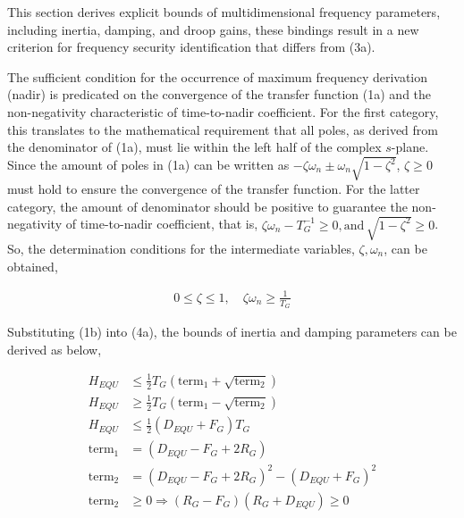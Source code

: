 \documentclass[lettersize,journal]{IEEEtran}
\begin{document}
This section derives explicit bounds of multidimensional frequency parameters, including inertia, damping, and droop gains, these bindings result in a new criterion for frequency security identification that differs from (3a).

The sufficient condition for the occurrence of maximum frequency derivation (nadir) is predicated on the convergence of the transfer function (1a) and the non-negativity characteristic of time-to-nadir coefficient. For the first category, this translates to the mathematical requirement that all poles, as derived from the denominator of (1a), must lie within the left half of the complex $s$-plane. Since the amount of poles in (1a) can be written as $-\zeta \omega_n \pm \omega_n \sqrt{1 - \zeta^2}$, $\zeta \geq 0$ must hold to ensure the convergence of the transfer function. For the latter category, the amount of denominator should be positive to guarantee the non-negativity of time-to-nadir coefficient, that is, $\zeta \omega_n - T_G^{-1}\geq 0, \text{and}\, \sqrt{1-\zeta^2} \geq 0$. So, the determination conditions for the intermediate variables, $\zeta, \omega_n$, can be obtained,

\begin{subequations}
  \begin{align}
    0 \leq \zeta \leq 1, \quad \zeta \omega_n \geq \frac{1}{T_G} \label{eq:zeta_wn}
    \end{align}
  \end{subequations}

Substituting (1b) into (4a), the bounds of inertia and damping parameters can be derived as below,

\begin{subequations}
  \begin{align}
    H_{EQU} &\leq \frac{1}{2}T_G \left(\text{term}_1 + \sqrt{\text{term}_2} \right) \\
    H_{EQU} &\geq \frac{1}{2}T_G \left(\text{term}_1 - \sqrt{\text{term}_2} \right) \\
    H_{EQU} &\leq \frac{1}{2} (D_{EQU} + F_G) T_{G} \\
    \text{term}_1 &= (D_{EQU} - F_G + 2R_G) \\
    \text{term}_2 &= {(D_{EQU} - F_G + 2R_G)^2 - (D_{EQU} + F_G)^2}\\
    \text{term}_2 &\geq 0 \Longrightarrow (R_G - F_G)(R_G + D_{EQU}) \geq 0
    \end{align}
  \end{subequations}
\end{document}
